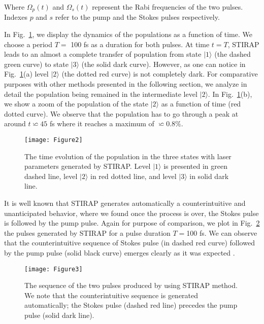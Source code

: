 \documentclass[]{interact}
\theoremstyle{plain}%
\theoremstyle{definition}
\theoremstyle{remark}
\begin{document}
Where $\Omega_p(t)$ and $\Omega_s(t)$ represent the Rabi frequencies of 
the two pulses. Indexes $p$ and $s$ refer to the pump and the 
Stokes pulses respectively. 

In Fig.~\ref{fig:Populations-STIRAP}, we display the dynamics of the 
populations as a function of time. We choose a period $T=$ 100 fs as a 
duration for both pulses. 
At time $t=T$,  STIRAP leads to an almost a complete 
transfer of population from state $|1\rangle$ (the dashed green curve) to state 
$|3\rangle$ (the solid dark curve). However, as one can notice 
in Fig.~\ref{fig:Populations-STIRAP}(a) level $|2\rangle$  (the dotted red 
curve) is not completely dark. 
For comparative purposes with other methods presented in the following section, 
we analyze in detail the population being remained in the intermediate level 
$|2\rangle$.  In Fig.~\ref{fig:Populations-STIRAP}(b), we show a zoom of the 
population of the state $|2\rangle$ as a function of time (red dotted curve). 
We observe that the population has to go through a peak at around $t\backsimeq 
45$ fs where it reaches a maximum of $\backsimeq0.8\%$. 
\begin{figure}[h!]
\centering
\texttt{[image: Figure2]}
\caption{The time evolution of the population in the three states with laser 
parameters generated by STIRAP. Level $|1\rangle$ is presented in green dashed 
line, level $|2\rangle$ in red dotted line, and level $|3\rangle$ in solid dark 
line. \label{fig:Populations-STIRAP}}
\end{figure}
It is well known that STIRAP generates automatically a counterintuitive 
and unanticipated behavior, where we found once the process is over, the 
Stokes pulse is followed by the pump pulse. 
Again for purpose of comparison, we plot in Fig.~\ref{fig:Pulses-STIRAP} the 
pulses generated by 
STIRAP for a pulse duration $T=$100 fs. 
We can observe that the 
counterintuitive sequence of Stokes pulse 
(in dashed red curve) followed by the pump pulse (solid black curve) emerges 
clearly as it was expected \cite{Vitanov}.
\begin{figure}[h!]
\centering
\texttt{[image: Figure3]}
\caption{The sequence of the two pulses produced by using STIRAP method. We 
note that the counterintuitive sequence 
is generated automatically; the Stokes pulse (dashed red line) precedes the 
pump pulse (solid dark line).
\label{fig:Pulses-STIRAP}}
\end{figure}
\end{document}
